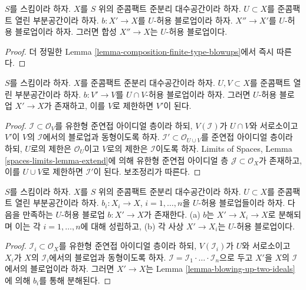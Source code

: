 \begin{lemma}
\label{lemma-composition-admissible-blowups}
$S$를 스킴이라 하자.
$X$를 $S$ 위의 준콤팩트 준분리 대수공간이라 하자.
$U \subset X$를 준콤팩트 열린 부분공간이라 하자.
$b : X' \to X$를 $U$-허용 블로업이라 하자.
$X'' \to X'$를 $U$-허용 블로업이라 하자.
그러면 합성 $X'' \to X$는 $U$-허용 블로업이다.
\end{lemma}

\begin{proof}
더 정밀한 Lemma \ref{lemma-composition-finite-type-blowups}에서 즉시 따른다.
\end{proof}

\begin{lemma}
\label{lemma-extend-admissible-blowups}
$S$를 스킴이라 하자.
$X$를 준콤팩트 준분리 대수공간이라 하자.
$U, V \subset X$를 준콤팩트 열린 부분공간이라 하자.
$b : V' \to V$를 $U \cap V$-허용 블로업이라 하자.
그러면 $U$-허용 블로업 $X' \to X$가 존재하고, 이를 $V$로 제한하면
$V'$이 된다.
\end{lemma}

\begin{proof}
$\mathcal{I} \subset \mathcal{O}_V$를 유한형 준연접 아이디얼 층이라 하되,
$V(\mathcal{I})$가 $U \cap V$와 서로소이고 $V'$이 $V$의
$\mathcal{I}$에서의 블로업과 동형이도록 하자.
$\mathcal{I}' \subset \mathcal{O}_{U \cup V}$를 준연접 아이디얼 층이라
하되, $U$로의 제한은 $\mathcal{O}_U$이고 $V$로의 제한은
$\mathcal{I}$이도록 하자. Limits of Spaces, Lemma
\ref{spaces-limits-lemma-extend}에 의해 유한형 준연접 아이디얼 층
$\mathcal{J} \subset \mathcal{O}_X$가 존재하고, 이를 $U \cup V$로
제한하면 $\mathcal{I}'$이 된다. 보조정리가 따른다.
\end{proof}

\begin{lemma}
\label{lemma-dominate-admissible-blowups}
$S$를 스킴이라 하자.
$X$를 $S$ 위의 준콤팩트 준분리 대수공간이라 하자.
$U \subset X$를 준콤팩트 열린 부분공간이라 하자.
$b_i : X_i \to X$, $i = 1, \ldots, n$을 $U$-허용 블로업들이라 하자.
다음을 만족하는 $U$-허용 블로업 $b : X' \to X$가 존재한다.
(a) $b$는 $X' \to X_i \to X$로 분해되며 이는 각
$i = 1, \ldots, n$에 대해 성립하고,
(b) 각 사상 $X' \to X_i$는 $U$-허용 블로업이다.
\end{lemma}

\begin{proof}
$\mathcal{I}_i \subset \mathcal{O}_X$를 유한형 준연접 아이디얼 층이라 하되,
$V(\mathcal{I}_i)$가 $U$와 서로소이고 $X_i$가 $X$의
$\mathcal{I}_i$에서의 블로업과 동형이도록 하자.
$\mathcal{I} = \mathcal{I}_1 \cdot \ldots \cdot \mathcal{I}_n$으로 두고
$X'$을 $X$의 $\mathcal{I}$에서의 블로업이라 하자. 그러면
$X' \to X$는 Lemma \ref{lemma-blowing-up-two-ideals}에 의해 $b_i$를
통해 분해된다.
\end{proof}

